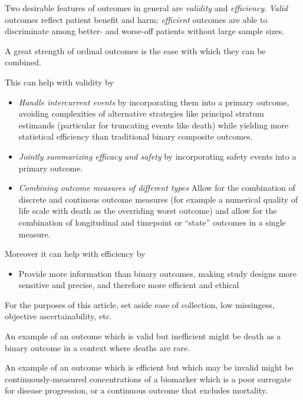 \documentclass[
  11pt,
  fleqn
]{article}
\begin{document}
Two desirable features of outcomes in general are \emph{validity} and
\emph{efficiency}.
\emph{Valid} outcomes reflect
patient benefit and harm; \emph{efficient} outcomes
are able to discriminate among better- and worse-off
patients without large sample sizes.

A great strength of ordinal outcomes is the ease with which they can
be combined.

This can help with validity by

\begin{itemize}
  \item \emph{Handle intercurrent events} by incorporating them into a primary
    outcome, avoiding complexities of alternative strategies like
    principal stratum
    estimands (particular for truncating events like death) while
    yielding more
    statistical efficiency than traditional binary composite outcomes.

  \item \emph{Jointly summarizing efficacy and safety} by incorporating
    safety events into a
    primary outcome.

  \item \emph{Combining outcome measures of different types} Allow
    for the combination of discrete and continous outcome
    measures (for
      example a numerical quality of life scale with death as the
      overriding worst
    outcome) and allow for the combination of longitudinal and timepoint or
    ``state'' outcomes in a single measure.
\end{itemize}

Moreover it can help with efficiency by

\begin{itemize}
  \item Provide more information than binary outcomes, making study
    designs more sensitive and precise, and
    therefore more efficient and ethical
\end{itemize}

For the purposes of this
article, set aside ease of collection, low missingess, objective
ascertainability, etc.

An example of an outcome which is valid but inefficient might be
death as a binary outcome in a context where deaths
are rare.

An example of an outcome which is efficient but which may be invalid
might be continuously-measured concentrations of a biomarker which is a poor
surrogate for disease progression, or a continuous outcome that
excludes mortality.
\end{document}
